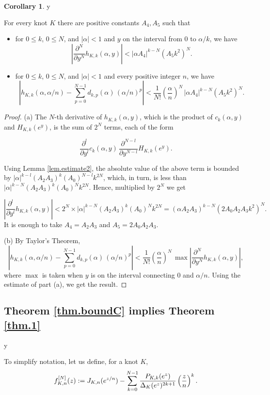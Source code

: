 \documentclass{amsart}
\theoremstyle{definition}
\newtheorem{corollary}[theorem]{Corollary}
\def\printname#1{
    \if\draft y
        \smash{\makebox[0pt]{\hspace{-0.5in}
            \raisebox{8pt}{\tt\tiny #1}}}
    \fi
}
\def\lbl#1{\label{#1}\printname{#1}}
\def\D{\Delta}
\def\a{\alpha}
\begin{document}
\begin{corollary}
\lbl{14}
For every knot $K$ there are positive constants $A_4, A_5$ such
that
\begin{itemize}
\item[(a)] for $0\le k$, $0\le N$,  and  $|\a| <1$ and $y$  on the
interval from $0$ to $\a/k$, we have
$$ \left |   \frac{\partial^N}{\partial y^N}h_{K,k}(\a,y) \right |
< |\a A_4|^{k-N} (A_5 k^2)^N.
$$
\item[(b)] for $0\le k$, $0\le N$, and  $|\a| <1$  and every positive
integer $n$, we have
$$ \left | h_{K,k}(\a, \a/n) - \sum_{p=0}^{N-1} d_{k,p}(\a) \,
 (\a/n)^p \right|  < \frac{1}{N!}
\left( \frac{\a}{n} \right)^N \, |\a A_4|^{k-N} (A_5 k^2)^N.
$$
\end{itemize}
\end{corollary}

\begin{proof} (a) The $N$-th derivative of $h_{K,k}(\a,y)$, which is
the product of $c_k(\a,y)$ and $H_{K,k}(e^y)$, is the sum of $2^N$
terms, each  of the form

$$
\frac{\partial^l}{\partial y^l} c_k(\a,y) \, \frac{\partial^{N-l}}{\partial
y^{N-l}}H_{K,k}(e^y).
$$

Using  Lemma \ref{lem.estimate2}, the absolute value of the above
term is bounded by $|\a|^{k-l} (A_2A_3)^k (A_0)^{N-l} k^{2N}$, which,
in turn, is less than  $|\a|^{k-N} (A_2A_3)^k (A_0)^{N} k^{2N}$. Hence,
multiplied by $2^N$ we get

$$ \left| \frac{\partial^l}{\partial y^l} h_{K,k}(\a,y) \right| < 2^N
\times |\a|^{k-N} (A_2A_3)^k (A_0)^{N} k^{2N} = (\a A_2A_3)^{k-N}
(2A_0A_2A_3 k^2)^N.
$$
It is enough to take $A_4=A_2A_3$ and $A_5= 2A_0A_2A_3$.

(b) By Taylor's Theorem,
$$
\left | h_{K,k}(\a, \a/n) - \sum_{p=0}^{N-1} d_{k,p}(\a) \,
 (\a/n)^p \right|  < \frac{1}{N!} \left( \frac{\a}{n} \right)^N
 \,\max \left|\frac{\partial^N}{\partial y^N}h_{K,k}(\a,y)\right
 |,
$$
where $\max$ is taken when $y$ is on the interval connecting 0 and
$\a/n$.
Using the  estimate of part (a), we get the result.
\end{proof}


\subsection{Theorem  \ref{thm.boundC} implies Theorem \ref{thm.1}}
\lbl{sub.thm1proof}

To simplify notation, let us define, for a knot $K$,
\begin{equation}
\lbl{eq.simplifynot}
f_{K,n}^{[N]}(z):=J_{K,n}(e^{z/n})-\sum_{k=0}^{N-1}
\frac{P_{K,k}(e^{z})}{\D_K(e^{z})^{2k+1}}
\left(\frac{z}{n}\right)^k.
\end{equation}
\end{document}
